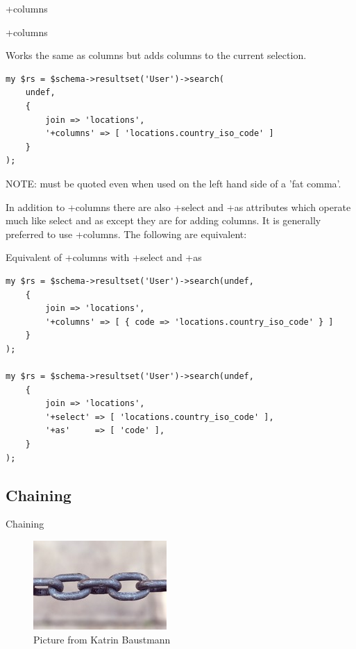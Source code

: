+columns

\begin{frame}[fragile]{+columns}

Works the same as columns but adds columns to the current selection.

\begin{lstlisting}
my $rs = $schema->resultset('User')->search(
    undef,
    {
        join => 'locations',
        '+columns' => [ 'locations.country_iso_code' ]
    }
);
\end{lstlisting}
\end{frame}

NOTE: must be quoted even when used on the left hand side of a 'fat comma'.

In addition to +columns there are also +select and +as attributes which
operate much like select and as except they are for adding columns. It is
generally preferred to use +columns. The following are equivalent:

\begin{frame}[fragile]{Equivalent of +columns with +select and +as}
\begin{lstlisting}
my $rs = $schema->resultset('User')->search(undef,
    {
        join => 'locations',
        '+columns' => [ { code => 'locations.country_iso_code' } ]
    }
);

my $rs = $schema->resultset('User')->search(undef,
    {
        join => 'locations',
        '+select' => [ 'locations.country_iso_code' ],
        '+as'     => [ 'code' ],
    }
);
\end{lstlisting}
\end{frame}

\subsection{Chaining}

\begin{frame}{Chaining}
  \begin{figure}[!ht]
    \begin{center}
      \includegraphics{img/chains.jpg}
      \caption[Chains]{Picture from Katrin Baustmann}
    \end{center}
  \end{figure}
\end{frame}

